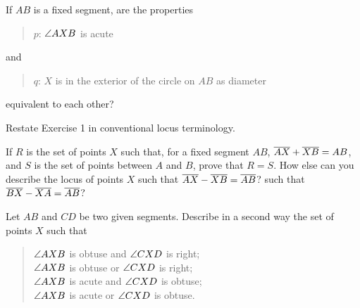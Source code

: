 \documentclass[11pt]{book}
\begin{document}
\begin{exlist}
\item If $AB$ is a fixed segment, are the properties
      \begin{quote}
      $p$: $\angle AXB$ is acute
      \end{quote}
      \noindent and
      \begin{quote}
      $q$: $X$ is in the exterior of the circle on $AB$ as diameter
      \end{quote}
      \noindent equivalent to each other?
\item Restate Exercise 1 in conventional locus terminology.
\item If $R$ is the set of points $X$ such that, for a fixed segment $AB$,
      $\overline{AX} + \overline{XB} = AB$, and $S$ is the set of points between $A$
      and $B$, prove that $R = S$. How else can you describe the locus of points
      $X$ such that $\overline{AX} - \overline{XB} = \overline{AB}$? such that
      $\overline{BX} - \overline{XA} = \overline{AB}$?
\item Let $AB$ and $CD$ be two given segments. Describe in a second way the set
      of points $X$ such that
      \begin{quote}
      $\angle AXB$ is obtuse and $\angle CXD$ is right;\\
      $\angle AXB$ is obtuse or $\angle CXD$ is right;\\
      $\angle AXB$ is acute and $\angle CXD$ is obtuse;\\
      $\angle AXB$ is acute or $\angle CXD$ is obtuse.
      \end{quote}
\end{exlist}
\end{document}
